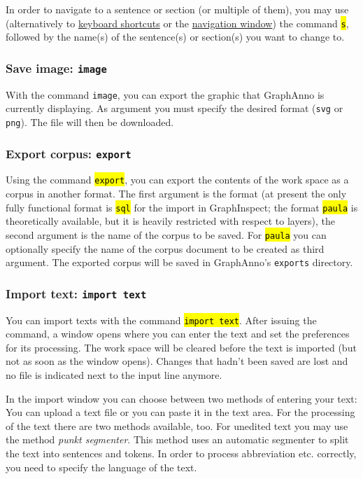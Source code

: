 \documentclass[12pt]{scrartcl}
\newcommand{\code}[1]{\hl{\texttt{#1}}}
\begin{document}
In order to navigate to a sentence or section (or multiple of them), you may use (alternatively to \hyperref[shortcuts]{keyboard shortcuts} or the \hyperref[window-navigation]{navigation window}) the command \code{s}, followed by the name(s) of the sentence(s) or section(s) you want to change to.


\subsubsection{Save image: \texttt{image}}

With the command \texttt{image}, you can export the graphic that GraphAnno is currently displaying.
As argument you must specify the desired format (\texttt{svg} or \texttt{png}).
The file will then be downloaded.


\subsubsection{Export corpus: \texttt{export}}\label{befehl-export}

Using the command \code{export}, you can export the contents of the work space as a corpus in another format.
The first argument is the format (at present the only fully functional format is \code{sql} for the import in GraphInspect; the format \code{paula} is theoretically available, but it is heavily restricted with respect to layers), the second argument is the name of the corpus to be saved.
For \code{paula} you can optionally specify the name of the corpus document to be created as third argument.
The exported corpus will be saved in GraphAnno’s \texttt{exports} directory.


\subsubsection{Import text: \texttt{import text}}\label{befehl-import}

You can import texts with the command \code{import text}. After issuing the command, a window opens where you can enter the text and set the preferences for its processing.
The work space will be cleared before the text is imported (but not as soon as the window opens).
Changes that hadn’t been saved are lost and no file is indicated next to the input line anymore.

In the import window you can choose between two methods of entering your text:
You can upload a text file or you can paste it in the text area.
For the processing of the text there are two methods available, too.
For unedited text you may use the method \textit{punkt segmenter}.
This method uses an automatic segmenter to split the text into sentences and tokens.
In order to process abbreviation etc. correctly, you need to specify the language of the text.
\end{document}
